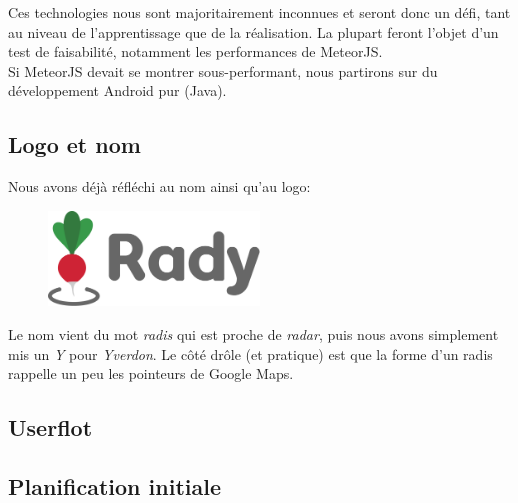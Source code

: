 \documentclass[french]{article}
\begin{document}
			Ces technologies nous sont majoritairement inconnues et seront donc un défi, tant au niveau de l'apprentissage que de la réalisation. La plupart feront l'objet d'un test de faisabilité, notamment les performances de MeteorJS.\\
			
			Si MeteorJS devait se montrer sous-performant, nous partirons sur du développement Android pur (Java).
			
		\subsection{Logo et nom}
			Nous avons déjà réfléchi au nom ainsi qu'au logo:
			\begin{figure}[H]
				\centering
				\includegraphics[width=0.5\textwidth]{../logo/logo}
			\end{figure}
			Le nom vient du mot \textit{radis} qui est proche de \textit{radar}, puis nous avons simplement mis un \textit{Y} pour \textit{Yverdon}. Le côté drôle (et pratique) est que la forme d'un radis rappelle un peu les pointeurs de Google Maps.
		
		\subsection{Userflot}
		\label{subsec:userflot}
		
		\subsection{Planification initiale}
			
\end{document}
